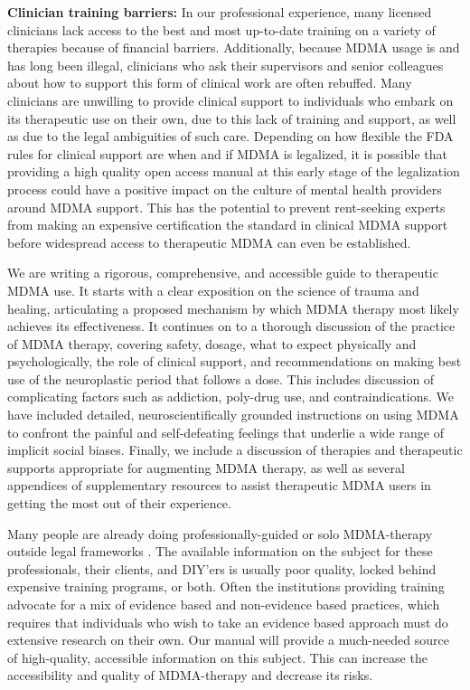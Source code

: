 \documentclass[12pt,letterpaper]{article}
\begin{document}
\textbf{Clinician training barriers:} In our professional experience, many licensed clinicians lack access to the best and most up-to-date training on a variety of therapies because of financial barriers. Additionally, because MDMA usage is and has long been illegal, clinicians who ask their supervisors and senior colleagues about how to support this form of clinical work are often rebuffed. Many clinicians are unwilling to provide clinical support to individuals who embark on its therapeutic use on their own, due to this lack of training and support, as well as due to the legal ambiguities of such care. Depending on how flexible the FDA rules for clinical support are when and if MDMA is legalized, it is possible that providing a high quality open access manual at this early stage of the legalization process could have a positive impact on the culture of mental health providers around MDMA support. This has the potential to prevent rent-seeking experts from making an expensive certification the standard in clinical MDMA support before widespread access to therapeutic MDMA can even be established.

We are writing a rigorous, comprehensive, and accessible guide to therapeutic MDMA use. It starts with a clear exposition on the science of trauma and healing, articulating a proposed mechanism by which MDMA therapy most likely achieves its effectiveness. It continues on to a thorough discussion of the practice of MDMA therapy, covering safety, dosage, what to expect physically and psychologically, the role of clinical support, and recommendations on making best use of the neuroplastic period that follows a dose. This includes discussion of complicating factors such as addiction, poly-drug use, and contraindications. We have included detailed, neuroscientifically grounded instructions on using MDMA to confront the painful and self-defeating feelings that underlie a wide range of implicit social biases. Finally, we include a discussion of therapies and therapeutic supports appropriate for augmenting MDMA therapy, as well as several appendices of supplementary resources to assist therapeutic MDMA users in getting the most out of their experience.

Many people are already doing professionally-guided or solo MDMA-therapy outside legal frameworks \cite{hillsSolo,passieHistory}. The available information on the subject for these professionals, their clients, and DIY'ers is usually poor quality, locked behind expensive training programs, or both. Often the institutions providing training advocate for a mix of evidence based and non-evidence based practices, which requires that individuals who wish to take an evidence based approach must do extensive research on their own. Our manual will provide a much-needed source of high-quality, accessible information on this subject. This can increase the accessibility and quality of MDMA-therapy and decrease its risks.
\end{document}
